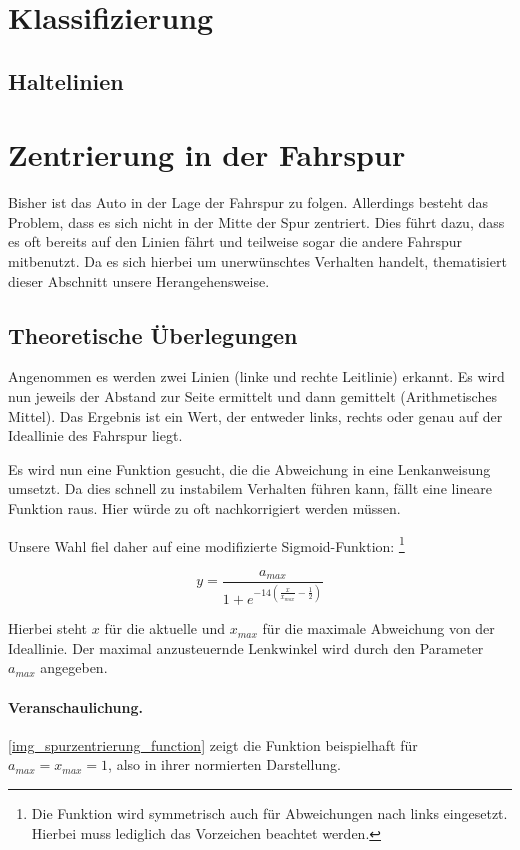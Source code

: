 \documentclass[a4paper,12pt]{report}
\begin{document}
\section{Klassifizierung}

\subsection{Haltelinien}

\section{Zentrierung in der Fahrspur}
	
	Bisher ist das Auto in der Lage der Fahrspur zu folgen.
	Allerdings besteht das Problem, dass es sich nicht in der Mitte der Spur zentriert.
	Dies führt dazu, dass es oft bereits auf den Linien fährt und teilweise sogar die andere Fahrspur mitbenutzt.
	Da es sich hierbei um unerwünschtes Verhalten handelt, thematisiert dieser Abschnitt unsere Herangehensweise.

\subsection{Theoretische Überlegungen}

	Angenommen es werden zwei Linien (linke und rechte Leitlinie) erkannt.
	Es wird nun jeweils der Abstand zur Seite ermittelt und dann gemittelt (Arithmetisches Mittel).
	Das Ergebnis ist ein Wert, der entweder links, rechts oder genau auf der Ideallinie des Fahrspur liegt.
	
	Es wird nun eine Funktion gesucht, die die Abweichung in eine Lenkanweisung umsetzt.
	Da dies schnell zu instabilem Verhalten führen kann, fällt eine lineare Funktion raus.
	Hier würde zu oft nachkorrigiert werden müssen.
	
	Unsere Wahl fiel daher auf eine modifizierte Sigmoid-Funktion:
	\footnote{Die Funktion wird symmetrisch auch für Abweichungen nach links eingesetzt. Hierbei muss lediglich das Vorzeichen beachtet werden.}
	
		\[y=\frac{a_{max}}{1 + e^{-14\left( \frac{x}{x_{max}} - \frac{1}{2} \right)}}\]
	
	Hierbei steht $x$ für die aktuelle und $x_{max}$ für die maximale Abweichung von der Ideallinie.
	Der maximal anzusteuernde Lenkwinkel wird durch den Parameter $a_{max}$ angegeben.
	
	\paragraph{Veranschaulichung.} \autoref{img_spurzentrierung_function} zeigt die Funktion beispielhaft für $a_{max} = x_{max} = 1$, also in ihrer normierten Darstellung.
	
\end{document}
